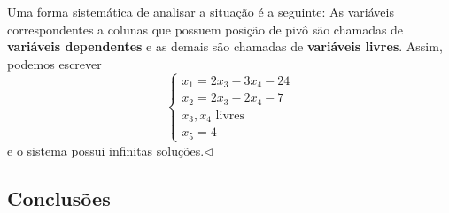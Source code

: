 \documentclass[../livro.tex]{subfiles} %
\begin{document}
\begin{example}
Uma forma sistemática de analisar a situação é a seguinte: As variáveis correspondentes a colunas que possuem posição de pivô são chamadas de \textbf{variáveis dependentes} e as demais são chamadas de \textbf{variáveis livres}. Assim, podemos escrever
\begin{equation}
\left\{
  \begin{array}{l}
       x_1  = 2 x_3 - 3 x_4 -24 \\
       x_2 = 2 x_3 - 2 x_4  -7  \\
       x_3, x_4 \text{ livres } \\
       x_5  = 4
  \end{array}
\right.
\end{equation} e o sistema possui infinitas soluções.$\lhd$
\end{example}


\subsection{Conclusões}
\end{document}
